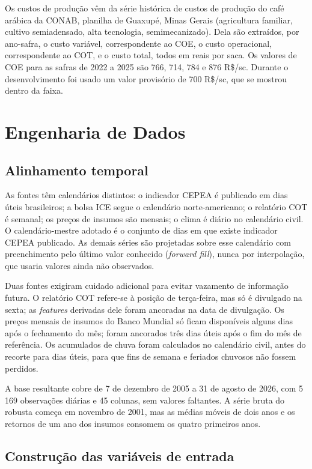 Os custos de produção vêm da série histórica de custos de produção do café arábica da CONAB, planilha de Guaxupé, Minas Gerais (agricultura familiar, cultivo semiadensado, alta tecnologia, semimecanizado). Dela são extraídos, por ano-safra, o custo variável, correspondente ao COE, o custo operacional, correspondente ao COT, e o custo total, todos em reais por saca. Os valores de COE para as safras de 2022 a 2025 são 766, 714, 784 e 876 R\$/sc. Durante o desenvolvimento foi usado um valor provisório de 700 R\$/sc, que se mostrou dentro da faixa.

\section{Engenharia de Dados}\label{sec2:pipeline}

\subsection{Alinhamento temporal}

As fontes têm calendários distintos: o indicador CEPEA é publicado em dias úteis brasileiros; a bolsa ICE segue o calendário norte-americano; o relatório COT é semanal; os preços de insumos são mensais; o clima é diário no calendário civil. O calendário-mestre adotado é o conjunto de dias em que existe indicador CEPEA publicado. As demais séries são projetadas sobre esse calendário com preenchimento pelo último valor conhecido (\textit{forward fill}), nunca por interpolação, que usaria valores ainda não observados.

Duas fontes exigiram cuidado adicional para evitar vazamento de informação futura. O relatório COT refere-se à posição de terça-feira, mas só é divulgado na sexta; as \textit{features} derivadas dele foram ancoradas na data de divulgação. Os preços mensais de insumos do Banco Mundial só ficam disponíveis alguns dias após o fechamento do mês; foram ancorados três dias úteis após o fim do mês de referência. Os acumulados de chuva foram calculados no calendário civil, antes do recorte para dias úteis, para que fins de semana e feriados chuvosos não fossem perdidos.

A base resultante cobre de 7 de dezembro de 2005 a 31 de agosto de 2026, com 5\,169 observações diárias e 45 colunas, sem valores faltantes. A série bruta do robusta começa em novembro de 2001, mas as médias móveis de dois anos e os retornos de um ano dos insumos consomem os quatro primeiros anos.

\subsection{Construção das variáveis de entrada}

